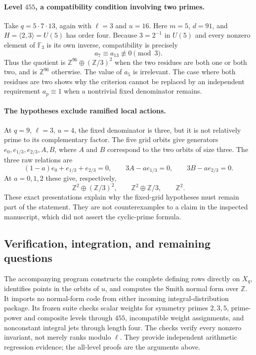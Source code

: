 \paragraph{Level $455$, a compatibility condition involving two primes.}
Take $q=5\cdot7\cdot13$, again with $\ell=3$ and $u=16$.
Here $m=5$, $d=91$, and
$H=\langle2,3\rangle=U(5)$ has order four.
Because $3=2^{-1}$ in $U(5)$ and every nonzero element of
$\mathbb F_3$ is its own inverse, compatibility is precisely
\[
 a_7\equiv a_{13}\not\equiv0\pmod3.
\]
Thus the quotient is
$\mathbb Z^{96}\oplus(\mathbb Z/3)^2$ when the two residues
are both one or both two, and is $\mathbb Z^{96}$ otherwise.
The value of $a_5$ is irrelevant. The case where both residues are
two shows why the criterion cannot be replaced by an independent
requirement $a_p\equiv1$ when a nontrivial fixed denominator remains.

\paragraph{The hypotheses exclude ramified local actions.}
At $q=9$, $\ell=3$, $u=4$, the fixed denominator is three, but it
is not relatively prime to its complementary factor. The five grid
orbits give generators $e_0,e_{1/3},e_{2/3},A,B$, where $A$ and
$B$ correspond to the two orbits of size three. The three raw
relations are
\[
 (1-a)e_0+e_{1/3}+e_{2/3}=0,\qquad
 3A-ae_{1/3}=0,\qquad 3B-ae_{2/3}=0.
\]
At $a=0,1,2$ these give, respectively,
\[
 \mathbb Z^2\oplus(\mathbb Z/3)^2,\qquad
 \mathbb Z^2\oplus\mathbb Z/3,\qquad
 \mathbb Z^2.
\]
These exact presentations explain why the fixed-grid hypotheses
must remain part of the statement. They are not counterexamples
to a claim in the inspected manuscript, which did not assert the
cyclic-prime formula.

\subsection{Verification, integration, and remaining questions}

The accompanying program constructs the complete defining rows
directly on $X_q$, identifies points in the orbits of $u$, and
computes the Smith normal form over $\mathbb Z$. It imports no
normal-form code from either incoming integral-distribution package.
Its frozen suite checks scalar weights for symmetry primes
$2,3,5$, prime-power and composite levels through $455$, incompatible
weight assignments, and nonconstant integral jets through length
four. The checks verify every nonzero invariant, not merely ranks
modulo $\ell$. They provide independent arithmetic regression
evidence; the all-level proofs are the arguments above.

